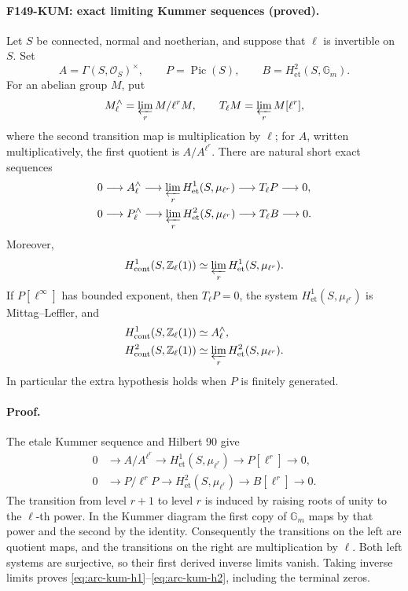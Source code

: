 \documentclass[11pt,a4paper]{article}
\theoremstyle{definition}
\begin{document}
\paragraph{F149-KUM: exact limiting Kummer sequences (proved).}
Let \(S\) be connected, normal and noetherian, and suppose that \(\ell\)
is invertible on \(S\).  Set
\[
 A=\Gamma(S,\mathcal O_S)^\times,\qquad
 P=\operatorname{Pic}(S),\qquad
 B=H^2_{\mathrm{et}}(S,\mathbb G_m).
\]
For an abelian group \(M\), put
\[
 M^\wedge_\ell=\varprojlim_r M/\ell^rM,
 \qquad
 T_\ell M=\varprojlim_r M[\ell^r],
\]
where the second transition map is multiplication by \(\ell\);
for \(A\), written multiplicatively, the first quotient is
\(A/A^{\ell^r}\).  There are natural short exact sequences
\begin{align}
 0&\longrightarrow A^\wedge_\ell
   \longrightarrow \varprojlim_r H^1_{\mathrm{et}}(S,\mu_{\ell^r})
   \longrightarrow T_\ell P\longrightarrow 0,\label{eq:arc-kum-h1}\\
 0&\longrightarrow P^\wedge_\ell
   \longrightarrow \varprojlim_r H^2_{\mathrm{et}}(S,\mu_{\ell^r})
   \longrightarrow T_\ell B\longrightarrow 0.\label{eq:arc-kum-h2}
\end{align}
Moreover,
\[
 H^1_{\mathrm{cont}}(S,\mathbb Z_\ell(1))
 \simeq \varprojlim_r H^1_{\mathrm{et}}(S,\mu_{\ell^r}).
\]
If \(P[\ell^\infty]\) has bounded exponent, then \(T_\ell P=0\), the
system \(H^1_{\mathrm{et}}(S,\mu_{\ell^r})\) is Mittag--Leffler, and
\begin{align*}
 H^1_{\mathrm{cont}}(S,\mathbb Z_\ell(1))&\simeq A^\wedge_\ell,\\
 H^2_{\mathrm{cont}}(S,\mathbb Z_\ell(1))
 &\simeq \varprojlim_r H^2_{\mathrm{et}}(S,\mu_{\ell^r}).
\end{align*}
In particular the extra hypothesis holds when \(P\) is finitely generated.

\paragraph{Proof.}
The etale Kummer sequence and Hilbert 90 give
\begin{align*}
 0&\longrightarrow A/A^{\ell^r}
   \longrightarrow H^1_{\mathrm{et}}(S,\mu_{\ell^r})
   \longrightarrow P[\ell^r]\longrightarrow 0,\\
 0&\longrightarrow P/\ell^rP
   \longrightarrow H^2_{\mathrm{et}}(S,\mu_{\ell^r})
   \longrightarrow B[\ell^r]\longrightarrow 0.
\end{align*}
The transition from level \(r+1\) to level \(r\) is induced by raising
roots of unity to the \(\ell\)-th power.  In the Kummer diagram the first
copy of \(\mathbb G_m\) maps by that power and the second by the identity.
Consequently the transitions on the left are quotient maps, and the
transitions on the right are multiplication by \(\ell\).  Both left
systems are surjective, so their first derived inverse limits vanish.
Taking inverse limits proves
\eqref{eq:arc-kum-h1}--\eqref{eq:arc-kum-h2}, including the terminal zeros.
\end{document}

